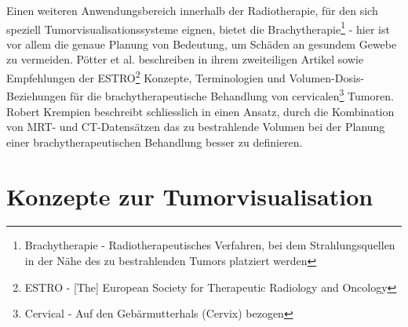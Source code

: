 \documentclass[pdftex,a4paper,titlepage,12pt]{scrartcl}
\newtheorem[L]{boxedDefinition}{Definition}
\begin{document}
\begin{itemize}
 Einen weiteren Anwendungsbereich innerhalb der Radiotherapie, für den sich speziell Tumorvisualisationssysteme eignen, bietet die Brachytherapie\footnote{Brachytherapie - Radiotherapeutisches Verfahren, bei dem Strahlungsquellen in der Nähe des zu bestrahlenden Tumors platziert werden} - hier ist vor allem die genaue Planung von Bedeutung, um Schäden an gesundem Gewebe zu vermeiden.
 Pötter et al. beschreiben in ihrem zweiteiligen Artikel \cite{Poetter2005} sowie \cite{Poetter2006} Empfehlungen der ESTRO\footnote{ESTRO - [The] European Society for Therapeutic Radiology and Oncology} Konzepte, Terminologien und Volumen-Dosis-Beziehungen für die brachytherapeutische Behandlung von cervicalen\footnote{Cervical - Auf den Gebärmutterhals (Cervix) bezogen} Tumoren. Robert Krempien beschreibt schliesslich in \cite{Krempien2003} einen Ansatz, durch die Kombination von MRT- und CT-Datensätzen das zu bestrahlende Volumen bei der Planung einer brachytherapeutischen Behandlung besser zu definieren.
\end{itemize}

\section{Konzepte zur Tumorvisualisation}\label{ssec:concepts}
\end{document}
